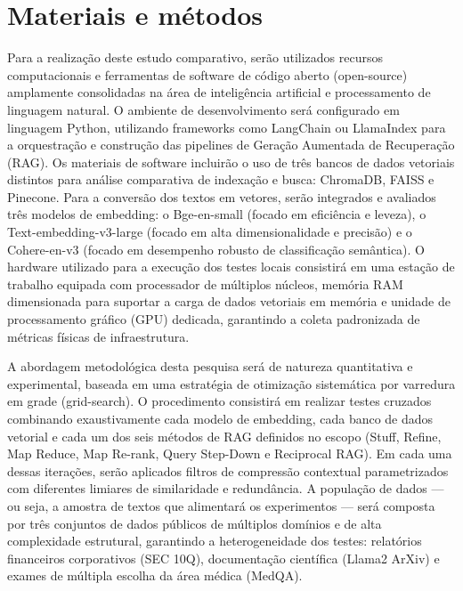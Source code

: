 \newpage
\section{Materiais e métodos}
\label{sc:materias_e_metodos}

Para a realização deste estudo comparativo, serão utilizados recursos computacionais e ferramentas de software de código aberto (open-source) amplamente consolidadas na área de inteligência artificial e processamento de linguagem natural. O ambiente de desenvolvimento será configurado em linguagem Python, utilizando frameworks como LangChain ou LlamaIndex para a orquestração e construção das pipelines de Geração Aumentada de Recuperação (RAG). Os materiais de software incluirão o uso de três bancos de dados vetoriais distintos para análise comparativa de indexação e busca: ChromaDB, FAISS e Pinecone. Para a conversão dos textos em vetores, serão integrados e avaliados três modelos de embedding: o Bge-en-small (focado em eficiência e leveza), o Text-embedding-v3-large (focado em alta dimensionalidade e precisão) e o Cohere-en-v3 (focado em desempenho robusto de classificação semântica). O hardware utilizado para a execução dos testes locais consistirá em uma estação de trabalho equipada com processador de múltiplos núcleos, memória RAM dimensionada para suportar a carga de dados vetoriais em memória e unidade de processamento gráfico (GPU) dedicada, garantindo a coleta padronizada de métricas físicas de infraestrutura.

A abordagem metodológica desta pesquisa será de natureza quantitativa e experimental, baseada em uma estratégia de otimização sistemática por varredura em grade (grid-search). O procedimento consistirá em realizar testes cruzados combinando exaustivamente cada modelo de embedding, cada banco de dados vetorial e cada um dos seis métodos de RAG definidos no escopo (Stuff, Refine, Map Reduce, Map Re-rank, Query Step-Down e Reciprocal RAG). Em cada uma dessas iterações, serão aplicados filtros de compressão contextual parametrizados com diferentes limiares de similaridade e redundância. A população de dados — ou seja, a amostra de textos que alimentará os experimentos — será composta por três conjuntos de dados públicos de múltiplos domínios e de alta complexidade estrutural, garantindo a heterogeneidade dos testes: relatórios financeiros corporativos (SEC 10Q), documentação científica (Llama2 ArXiv) e exames de múltipla escolha da área médica (MedQA).

